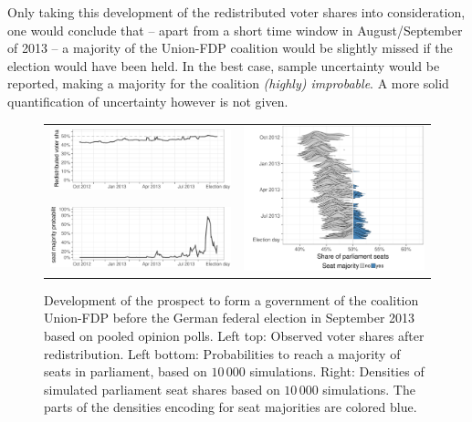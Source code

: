 \documentclass[smallcondensed]{svjour3}     %
\begin{document}
Only taking this development of the redistributed voter shares into
consideration, one would conclude that -- apart from a short
time window in August/September of 2013 -- a majority of the Union-FDP
coalition would be slightly missed if the election would have been held.
In the best case, sample uncertainty would be reported, making
a majority for the coalition {\it (highly) improbable}. A more
solid quantification of uncertainty however is not given.

\begin{figure}[H]\centering
\begin{tabular}{ll}
\includegraphics[height=.15\textwidth]{figures/2013_pooled_cdufdp_rawSharesRedist.pdf}
&
\multirow{2}{*}[13ex]{\includegraphics[height=.3\textwidth]{figures/2013_pooled_cdufdp_ridgeline.pdf}}
\\
\includegraphics[height=.15\textwidth]{figures/2013_pooled_cdufdp_prob.pdf}
\end{tabular}
\caption{Development of the prospect to form a government of the coalition Union-FDP before the German federal election in September 2013 based on pooled opinion polls.
Left top: Observed voter shares after redistribution. Left bottom: Probabilities to reach a majority of seats in parliament, based on $10\,000$ simulations. Right: Densities of simulated parliament seat shares based on $10\,000$ simulations. The parts of the densities encoding for seat majorities are colored blue.
\label{fig:2013_cdufdp}
}
\end{figure}
\end{document}

